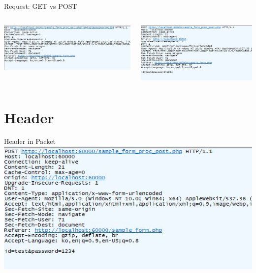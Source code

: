 \documentclass{beamer}
\begin{document}
    \begin{frame}{Request: GET vs POST}
        \begin{columns}
            \begin{column}{0.5\linewidth}
                \includegraphics[width=\linewidth]{Images/get_packet.JPG}
            \end{column}
            \begin{column}{0.5\linewidth}
                \includegraphics[width=\linewidth]{Images/post_packet.JPG}
            \end{column}
        \end{columns}
    \end{frame}

\section{Header}
    \begin{frame}{Header in Packet}
        \includegraphics[width=\linewidth]{Images/post_packet.JPG}
    \end{frame}
\end{document}
